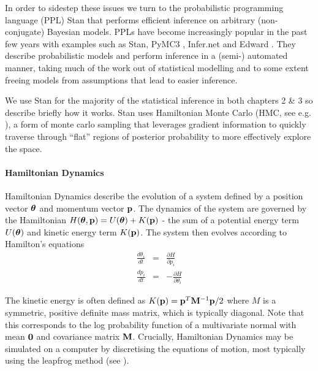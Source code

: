 In order to sidestep these issues we turn to the probabilistic programming language (PPL) Stan \cite{gelman2015stan} that performs efficient inference on arbitrary (non-conjugate) Bayesian models. PPLs have become increasingly popular in the past few years with examples such as Stan, PyMC3 \cite{salvatier2016probabilistic}, Infer.net \cite{wang2011using} and Edward \cite{Tran2016-ml}. They describe probabilistic models and perform inference in a (semi-) automated manner, taking much of the work out of statistical modelling and to some extent freeing models from assumptions that lead to easier inference.

We use Stan for the majority of the statistical inference in both chapters 2 \& 3 so describe briefly how it works. Stan uses Hamiltonian Monte Carlo (HMC, see e.g. \cite{neal2011mcmc}), a form of monte carlo sampling that leverages gradient information to quickly traverse through ``flat'' regions of posterior probability to more effectively explore the space.

\paragraph{Hamiltonian Dynamics}

Hamiltonian Dynamics describe the evolution of a system defined by a position vector $\bm{\theta}$ and momentum vector $\mathbf{p}$. The dynamics of the system are governed by the Hamiltonian $H(\bm{\theta}, \mathbf{p}) = U(\bm{\theta}) + K(\mathbf{p})$ - the sum of a potential energy term $U(\bm{\theta})$ and kinetic energy term $K(\mathbf{p})$. The system then evolves according to Hamilton's equations
\begin{equation}
\begin{aligned}
\frac{d\theta_i}{dt} & = & \frac{\partial H}{\partial p_i} \\
\frac{dp_i}{dt} & = & -\frac{\partial H}{\partial \theta_i}
\end{aligned} \label{eq:hd}
\end{equation}

The kinetic energy is often defined as $K({\bf p}) = {\bf p}^T \mathbf{M}^{-1} {\bf p} / 2$ where $M$ is a symmetric, positive definite mass matrix, which is typically diagonal. Note that this corresponds to the log probability function of a multivariate normal with mean $\bm{0}$ and covariance matrix $\mathbf{M}$. Crucially, Hamiltonian Dynamics may be simulated on a computer by discretising the equations of motion, most typically using the leapfrog method (see \cite{neal2011mcmc}).

